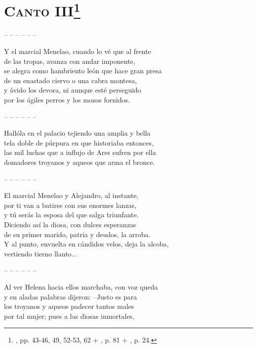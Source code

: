 \section*{\centering\textbf{\textsc{Canto} III}\footnote{\ehuno, pp. 43-46, 49, 52-53, 62 + \ehdos, p. 81 + \neh, p. 24.}}
%
\noindent-- -- -- -- -- --\par
%
\beginnumbering
\pstart
{}
Y el marcial Menelao, cuando lo vé que al frente\\
de las tropas, avanza con andar imponente,\\
se alegra como hambriento león que hace gran presa\\
de un enastado ciervo o una cabra montesa,\\
y ávido los devora, ni aunque esté perseguido\\
por los ágiles perros y los mozos fornidos.\par
\pend
%
\noindent-- -- -- -- -- --\par
%
\pstart
{}
Hallóla en el palacio tejiendo una amplia y bella\\
tela doble de púrpura en que historiaba entonces,\\
las mil luchas que a influjo de Ares sufren por ella\\
domadores troyanos y aqueos que arma el bronce.\par
\pend
%
\noindent-- -- -- -- -- --\par
%
\pstart
{}
El marcial Menelao y Alejandro, al instante,\\
por ti van a batirse con sus enormes lanzas,\\
y tú serás la esposa del que salga triunfante.\\
Diciendo así la diosa, con dulces esperanzas\\
de su primer marido, patria y deudos, la arroba.\\
Y al punto, envuelta en cándidos velos, deja la alcoba,\\
vertiendo tierno llanto...\par
\pend
%
\noindent-- -- -- -- -- --\par
%
\pstart
{}
Al ver Helena hacia ellos marchaba, con voz queda\\
y en aladas palabras dijeron: --Justo es para\\
los troyanos y aqueos padecer tantos males\\
por tal mujer; pues a las diosas inmortales,\\
